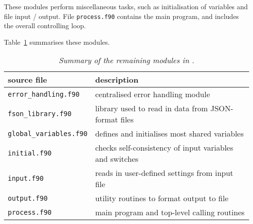These modules perform miscellaneous tasks, such as initialisation of variables
and file input / output. File \texttt{process.f90} contains the main program,
and includes the overall controlling loop.

Table~\ref{tab:other_modules} summarises these modules.

\begin{table}[tbph]
\begin{center}

\begin{tabular}{||l||l||} \hline
source file     & description \\ \hline
\texttt{error\_handling.f90} & centralised error handling module \\
\texttt{fson\_library.f90} & library used to read in data from JSON-format files \\
\texttt{global\_variables.f90} & defines and initialises most shared variables \\
\texttt{initial.f90} & checks self-consistency of input variables and switches \\
\texttt{input.f90} & reads in user-defined settings from input file \\
\texttt{output.f90} & utility routines to format output to file \\
\texttt{process.f90} & main program and top-level calling routines \\
\hline
\end{tabular}
\end{center}
\caption[Summary of other modules]
{\label{tab:other_modules}
  \textit{Summary of the remaining modules in \process.}
}
\end{table}

